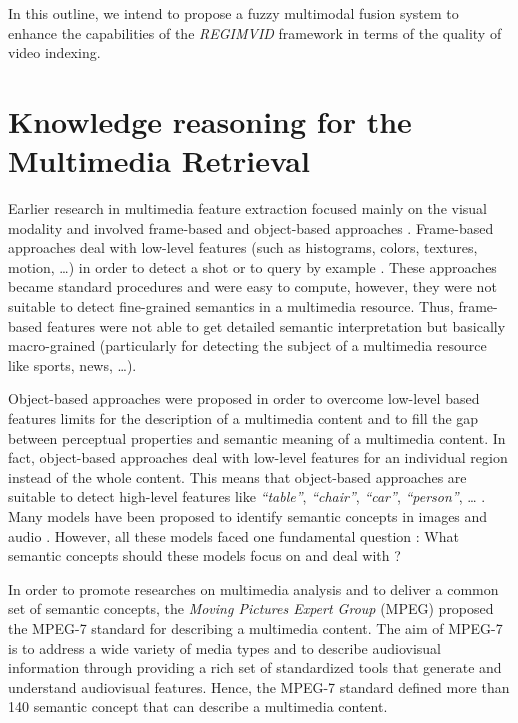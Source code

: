 		In this outline, we intend to propose a fuzzy multimodal fusion system to enhance the capabilities of the
		\emph{REGIMVID} framework in terms of the quality of video indexing. 










\section{Knowledge reasoning for the Multimedia Retrieval}

	Earlier research in multimedia feature extraction focused mainly on the visual modality and involved 
	frame-based and object-based approaches \citep{Puri2000,Deb2004,Snoek2005}. Frame-based approaches 
	deal with low-level features (such as histograms, colors, textures, motion, \dots{}) in order to detect 
	a shot or to query by example \citep{Brunelli1999,Antani2002,Kang2003,Smith2003}. These approaches became 
	standard procedures and were easy to compute, however,  they were not suitable to detect fine-grained semantics 
	in a multimedia resource. Thus, frame-based features were not able to get detailed semantic interpretation 
	but basically macro-grained (particularly for detecting the subject of a multimedia resource like sports, 
	news, \dots{}).

	Object-based approaches were proposed in order to overcome low-level based features limits for 
	the description of a multimedia content and to fill the gap between  perceptual properties and semantic 
	meaning of a multimedia content. In fact, object-based approaches deal with low-level features for 
	an individual region instead of the whole content. This means that object-based approaches are suitable 
	to detect high-level features like \emph{``table''}, \emph{``chair''}, \emph{``car''}, \emph{``person''}, 
	\dots{} \citep{Snoek2006,Lew2006,Spyrou2008}. Many models have been proposed to identify semantic concepts 
	in images \citep{Jurie2005,Yang2007,Wang2010,Elleuch2011a} and audio \citep{You2010,Feki2011,Rawat2013}. 
	However, all these models faced one fundamental question : What semantic concepts
	should these models focus on and deal with ?

	In order to promote researches on multimedia analysis and to deliver a common set of semantic concepts, 
	the \textit{Moving Pictures Expert Group} (MPEG) proposed the MPEG-7 \citep{Salembier2002} standard for 
	describing a multimedia content. The aim of MPEG-7 is to address a wide variety of media types and to 
	describe audiovisual information through providing a rich set of standardized tools that generate and 
	understand audiovisual features. Hence, the MPEG-7 standard defined more than 140 semantic concept that 
	can describe  a multimedia content.

